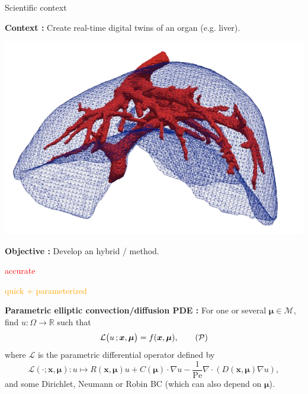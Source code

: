 \begin{frame}{Scientific context}
	\begin{minipage}{0.75\linewidth}
		\textbf{Context :} Create real-time digital twins of an organ (e.g. liver).
	\end{minipage}
	\begin{minipage}{0.21\linewidth}
		\vspace{-20pt}
		\includegraphics[width=\linewidth]{images/intro/liver.png}
	\end{minipage}
	
	\vspace{5pt}
	\textbf{Objective :} Develop an hybrid  /  method.
	
	\vspace{1pt}
	\small
	\hspace{130pt} \begin{minipage}{0.14\linewidth}
		\textcolor{red}{accurate}
	\end{minipage} \hspace{8pt} \begin{minipage}{0.3\linewidth}
		\textcolor{orange}{quick + parameterized}
	\end{minipage}

	\normalsize
	\vspace{5pt}
	\textbf{Parametric elliptic convection/diffusion PDE :}
	For one or several  $\bm{\mu}\in \mathcal{M}$, find $u: \Omega\to \mathbb{R}$ such that
	\begin{equation}
		\label{eq:ob_pde}
		\mathcal{L}\big(u\,;\bm{x},\bm{\mu}\big) = f(\bm{x},\bm{\mu}),
		\tag{$\mathcal{P}$}
	\end{equation}
	where $\mathcal{L}$ is the parametric differential operator defined  by
	\begin{equation*}
		\mathcal{L}(\cdot;\bm{x},\bm{\mu}) : u \mapsto R(\bm{x},\bm{\mu}) u + C(\bm{\mu}) \cdot \nabla u - \frac{1}{\text{Pe}} \nabla \cdot (D(\bm{x},\bm{\mu}) \nabla u),
	\end{equation*}
	and some Dirichlet, Neumann or Robin BC (which can also depend on $\bm{\mu}$).
\end{frame}

